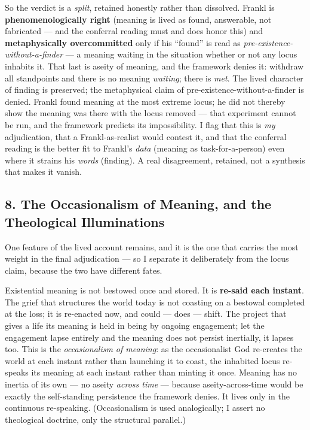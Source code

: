 \documentclass[11pt]{article}
\begin{document}
So the verdict is a \emph{split}, retained honestly rather than dissolved. Frankl is \textbf{phenomenologically right} (meaning is lived as found, answerable, not fabricated — and the conferral reading must and does honor this) and \textbf{metaphysically overcommitted} only if his ``found'' is read as \emph{pre-existence-without-a-finder} — a meaning waiting in the situation whether or not any locus inhabits it. That last is aseity of meaning, and the framework denies it: withdraw all standpoints and there is no meaning \emph{waiting}; there is \emph{met}. The lived character of finding is preserved; the metaphysical claim of pre-existence-without-a-finder is denied. Frankl found meaning at the most extreme locus; he did not thereby show the meaning was there with the locus removed — that experiment cannot be run, and the framework predicts its impossibility. I flag that this is \emph{my} adjudication, that a Frankl-as-realist would contest it, and that the conferral reading is the better fit to Frankl's \emph{data} (meaning as task-for-a-person) even where it strains his \emph{words} (finding). A real disagreement, retained, not a synthesis that makes it vanish.

\subsection*{8. The Occasionalism of Meaning, and the Theological Illuminations}

One feature of the lived account remains, and it is the one that carries the most weight in the final adjudication — so I separate it deliberately from the locus claim, because the two have different fates.

Existential meaning is not bestowed once and stored. It is \textbf{re-said each instant}. The grief that structures the world today is not coasting on a bestowal completed at the loss; it is re-enacted now, and could — does — shift. The project that gives a life its meaning is held in being by ongoing engagement; let the engagement lapse entirely and the meaning does not persist inertially, it lapses too. This is the \emph{occasionalism of meaning}: as the occasionalist God re-creates the world at each instant rather than launching it to coast, the inhabited locus re-speaks its meaning at each instant rather than minting it once. Meaning has no inertia of its own — no aseity \emph{across time} — because aseity-across-time would be exactly the self-standing persistence the framework denies. It lives only in the continuous re-speaking. (Occasionalism is used analogically; I assert no theological doctrine, only the structural parallel.)
\end{document}
